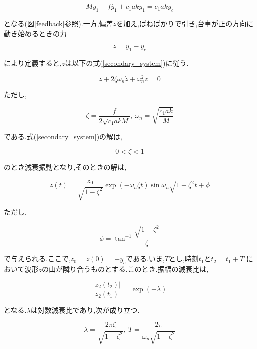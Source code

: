 \begin{enumerate}
\begin{itemize}
        \begin{equation}
            M \ddot{y_{1}} + f \dot{y_{1}} + c_{1}aky_{1} = c_{1}aky_{c}
        \end{equation}

        となる(図\ref{feedback}参照).一方,偏差$z$を加え,ばねばかりで引き,台車が正の方向に動き始めるときの力

        \begin{equation}
            z = y_{1} - y_{c}
        \end{equation}

        により定義すると,$z$は以下の式(\ref{secondary_system})に従う.

        \begin{equation}
            \ddot{z} + 2\zeta \omega_{n} \dot{z} + \omega_{n}^2 z = 0
            \label{secondary_system}
        \end{equation}

        ただし,

        \begin{equation}
            \zeta = \frac{f}{2\sqrt{c_{1}akM}},\ \omega_{n} = \sqrt{\frac{c_{1}ak}{M}}
            \label{zeta}
        \end{equation}

        である.式(\ref{secondary_system})の解は,

        $$
            0 < \zeta < 1
        $$

        のとき減衰振動となり,そのときの解は,

        $$
            z(t) = \frac{z_{0}}{\sqrt{1 - \zeta^2}} \exp(-\omega_{n} \zeta t)
            \sin{\omega_{n}} \sqrt{1 - \zeta^2}t + \phi
        $$

        ただし,
        
        $$
            \phi = \tan^{-1}{\frac{\sqrt{1 - \zeta^2}}{\zeta}}
        $$

        で与えられる.ここで,$z_{0} = z(0) = -y_{c}$である.いま,$T$とし,時刻$t_{1}$と$t_{2} = t_{1} + T$
        において波形$z$の山が隣り合うものとする.このとき.振幅の減衰比は,

        \begin{equation}
            \frac{|z_{2}(t_{2})|}{z_{2}(t_{1})} = \exp(-\lambda)
        \end{equation}

        となる.$\lambda$は対数減衰比であり,次が成り立つ.

        \begin{equation}
            \lambda = \frac{2\pi \zeta}{\sqrt{1 - \zeta^2}},\
            T = \frac{2\pi}{\omega_{n} \sqrt{1 - \zeta^2}}
            \label{lambda}
        \end{equation}


\end{itemize}
\end{enumerate}
